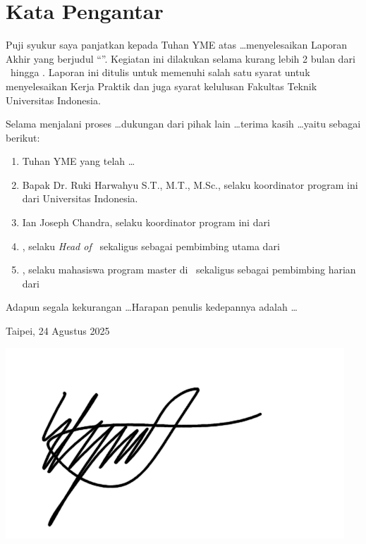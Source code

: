 \chapter*{Kata Pengantar}

Puji syukur saya panjatkan kepada Tuhan YME atas \ldots menyelesaikan Laporan Akhir yang berjudul “\judul”. Kegiatan ini dilakukan selama
kurang lebih 2 bulan dari \startMagang \ hingga \akhirMagang. Laporan ini ditulis
untuk memenuhi salah satu syarat untuk menyelesaikan Kerja Praktik dan juga
syarat kelulusan Fakultas Teknik Universitas Indonesia.

Selama menjalani proses \ldots dukungan dari
pihak lain \ldots terima kasih \ldots yaitu sebagai berikut:

\begin{enumerate}
	\item Tuhan YME yang telah \ldots	
        \item Bapak Dr. Ruki Harwahyu S.T., M.T., M.Sc., selaku koordinator
        program ini dari Universitas Indonesia.
	\item Ian Joseph Chandra, selaku koordinator program ini dari \namaUniv
	\item \pembimbingUtama, selaku 
        \textit{Head of }\namaLab \ sekaligus sebagai pembimbing utama dari \namaUniv
	\item \pembimbingHarian, selaku mahasiswa program master di \namaLab \ sekaligus sebagai pembimbing harian dari \namaUniv
\end{enumerate}

Adapun segala kekurangan \ldots Harapan penulis kedepannya adalah \ldots

\vspace*{1cm}
\begin{flushright}
    Taipei, 24 Agustus 2025

    \vspace{0.5cm}
    
    \includegraphics[width=0.25\linewidth]{assets/TandaTangan.png}\\[0.5cm]

    \penulis

\end{flushright}